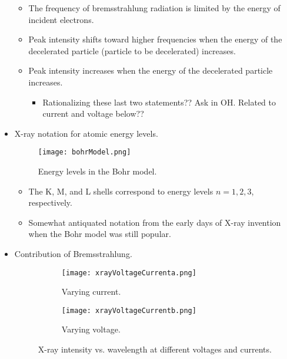 \documentclass[../notes.tex]{subfiles}
\begin{document}
\begin{itemize}
\begin{itemize}
        \item The frequency of bremsstrahlung radiation is limited by the energy of incident electrons.
        \item Peak intensity shifts toward higher frequencies when the energy of the decelerated particle (particle to be decelerated) increases.
        \item Peak intensity increases when the energy of the decelerated particle increases.
        \begin{itemize}
            \item Rationalizing these last two statements?? Ask in OH. Related to current and voltage below??
        \end{itemize}
    \end{itemize}
    \item X-ray notation for atomic energy levels.
    \begin{figure}[H]
        \centering
        \texttt{[image: bohrModel.png]}
        \caption{Energy levels in the Bohr model.}
        \label{fig:bohrModel}
    \end{figure}
    \begin{itemize}
        \item The K, M, and L shells correspond to energy levels $n=1,2,3$, respectively.
        \item Somewhat antiquated notation from the early days of X-ray invention when the Bohr model was still popular.
    \end{itemize}
    \item Contribution of Bremsstrahlung.
    \begin{figure}[h!]
        \centering
        \begin{subfigure}[b]{0.49\linewidth}
            \centering
            \texttt{[image: xrayVoltageCurrenta.png]}
            \caption{Varying current.}
            \label{fig:xrayVoltageCurrenta}
        \end{subfigure}
        \begin{subfigure}[b]{0.49\linewidth}
            \centering
            \texttt{[image: xrayVoltageCurrentb.png]}
            \caption{Varying voltage.}
            \label{fig:xrayVoltageCurrentb}
        \end{subfigure}
        \caption{X-ray intensity vs. wavelength at different voltages and currents.}
        \label{fig:xrayVoltageCurrent}
    \end{figure}
    \begin{itemize}

\end{itemize}
\end{itemize}
\end{document}
